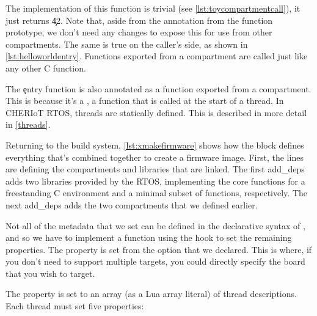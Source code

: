 \codelisting[filename=examples/hello_world/compartment.hh,marker=export,label=lst:helloexport,caption="Exporting a function for use by other compartments"]{}

The implementation of this function is trivial (see \ref{lst:toycompartmentcall}), it just returns \c{42}.
Note that, aside from the annotation from the function prototype, we don't need any changes to expose this for use from other compartments.
The same is true on the caller's side, as shown in \ref{lst:helloworldentry}.
Functions exported from a compartment are called just like any other C function.

\codelisting[filename=examples/hello_world/compartment.cc,marker=all,label=lst:toycompartmentcall,caption="A trivial implementation of an exported function"]{}

\codelisting[filename=examples/hello_world/hello.cc,marker=entry,label=lst:helloworldentry,caption="A simple compartment entry point that does a cross-compartment call"]{}

The \c{entry} function is also annotated as a function exported from a compartment.
This is because it's a , a function that is called at the start of a thread.
In CHERIoT RTOS, threads are statically defined.
This is described in more detail in \ref{threads}.

Returning to the build system, \ref{lst:xmakefirmware} shows how the  block defines everything that's combined together to create a firmware image.
First, the  lines are defining the compartments and libraries that are linked.
The first add_deps adds two libraries provided by the RTOS, implementing the core functions for a freestanding C environment and a minimal subset of  functions, respectively.
The next add_deps adds the two compartments that we defined earlier.

Not all of the metadata that we set can be defined in the declarative syntax of , and so we have to implement a function using the  hook to set the remaining properties.
The  property is set from the option that we declared.
This is where, if you don't need to support multiple targets, you could directly specify the board that you wish to target.

\lualisting[filename=examples/hello_world/xmake.lua,marker=firmware,label=lst:xmakefirmware,caption="Build system code for linking the final firmware image"]{}

The  property is set to an array (as a Lua array literal) of thread descriptions.
Each thread must set five properties:

